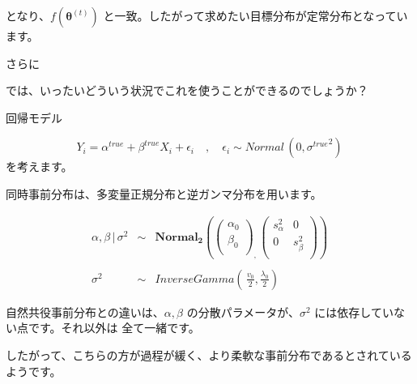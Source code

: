 \documentclass[
]{article}
\begin{document}
となり、\(f(\boldsymbol{\theta}^{(t)})\)
と一致。したがって求めたい目標分布が定常分布となっています。

さらに

では、いったいどういう状況でこれを使うことができるのでしょうか？

回帰モデル

\[
Y_i = \alpha^{true} + \beta^{true} X_i + \epsilon_i \quad,\quad \epsilon_i \sim Normal\,(0,{\sigma^{true}}^2)
\] を考えます。

同時事前分布は、多変量正規分布と逆ガンマ分布を用います。

\[ 
\begin{eqnarray}
\alpha,\beta\,|\,\sigma^2 &\sim& \boldsymbol{Normal_2} \left(
\begin{pmatrix}
\alpha_0 \\\beta_0 \\\end{pmatrix}_,\, 
\begin{pmatrix}
s_{\alpha}^2 & 0 \\0 & s_{\beta}^2 \\
\end{pmatrix}
\right)\\\\
\sigma^2&\sim& InverseGamma \left( \,\frac{v_0}{2},\frac{\lambda_0}{2} \right)
\end{eqnarray}
\]

自然共役事前分布との違いは、\(\alpha, \beta\)
の分散パラメータが、\(\sigma^2\) には依存していない点です。それ以外は
全て一緒です。

したがって、こちらの方が過程が緩く、より柔軟な事前分布であるとされているようです。
\end{document}
